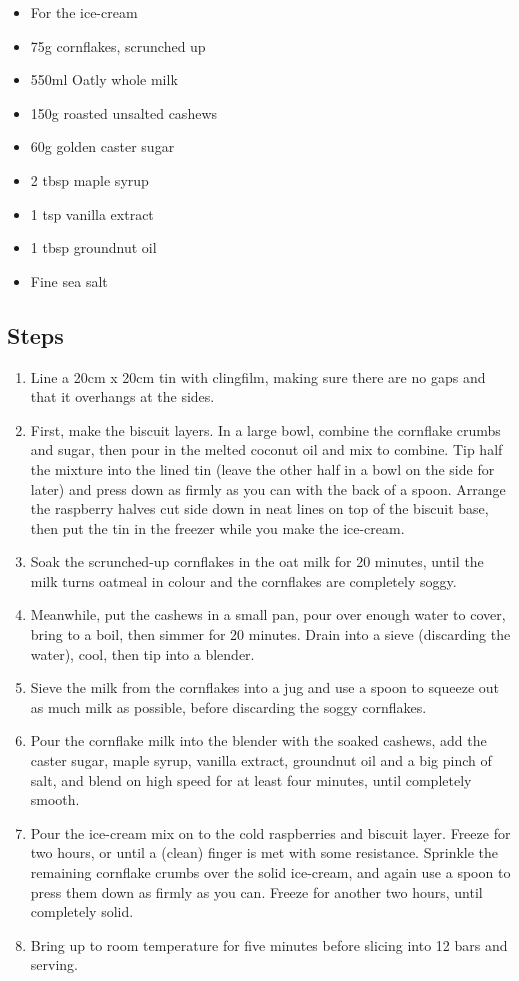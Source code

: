 \documentclass{book}
\begin{document}
\begin{itemize}
\item For the ice-cream
\item 75g cornflakes, scrunched up
\item 550ml Oatly whole milk
\item 150g roasted unsalted cashews
\item 60g golden caster sugar
\item 2 tbsp maple syrup
\item 1 tsp vanilla extract
\item 1 tbsp groundnut oil
\item Fine sea salt
\end{itemize}

\subsection*{Steps}
\begin{enumerate}
\item Line a 20cm x 20cm tin with clingfilm, making sure there are no gaps and that it overhangs at the sides.
\item First, make the biscuit layers. In a large bowl, combine the cornflake crumbs and sugar, then pour in the melted coconut oil and mix to combine. Tip half the mixture into the lined tin (leave the other half in a bowl on the side for later) and press down as firmly as you can with the back of a spoon. Arrange the raspberry halves cut side down in neat lines on top of the biscuit base, then put the tin in the freezer while you make the ice-cream.
\item Soak the scrunched-up cornflakes in the oat milk for 20 minutes, until the milk turns oatmeal in colour and the cornflakes are completely soggy.
\item Meanwhile, put the cashews in a small pan, pour over enough water to cover, bring to a boil, then simmer for 20 minutes. Drain into a sieve (discarding the water), cool, then tip into a blender. 
\item Sieve the milk from the cornflakes into a jug and use a spoon to squeeze out as much milk as possible, before discarding the soggy cornflakes.
\item Pour the cornflake milk into the blender with the soaked cashews, add the caster sugar, maple syrup, vanilla extract, groundnut oil and a big pinch of salt, and blend on high speed for at least four minutes, until completely smooth.
\item Pour the ice-cream mix on to the cold raspberries and biscuit layer. Freeze for two hours, or until a (clean) finger is met with some resistance. Sprinkle the remaining cornflake crumbs over the solid ice-cream, and again use a spoon to press them down as firmly as you can. Freeze for another two hours, until completely solid.
\item Bring up to room temperature for five minutes before slicing into 12 bars and serving.
\end{enumerate}
\newpage
\end{document}
